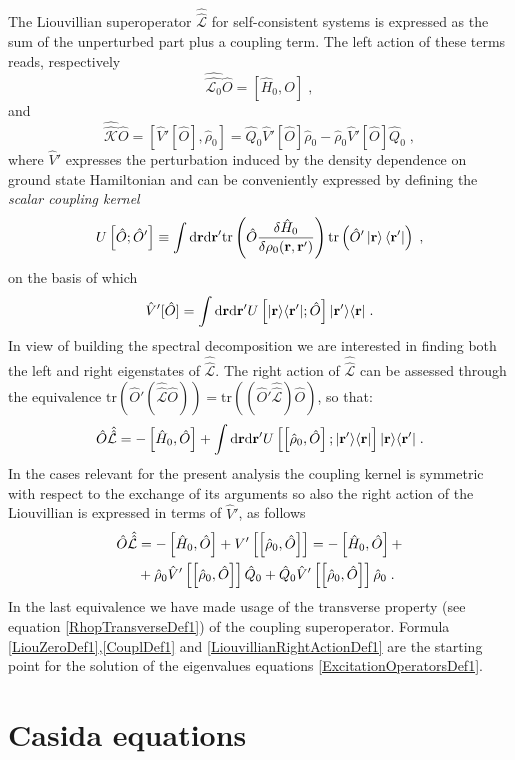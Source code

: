 \documentclass[reprint,aps,prb]{revtex4-1}
\newcommand{\dd}{{\rm d}}
\renewcommand{\r}{{\bf r}}
\newcommand{\be}{\begin{equation}}
\newcommand{\ee}{\end{equation}}
\newcommand{\nn}{\notag}
\newcommand{\lb}{\label}
\newcommand{\op}[1]{\hat {#1}}
\newcommand{\sop}[1]{\op{\op {#1}}}
\newcommand{\commutator}[2]{\left[ {#1} , {#2} \right]}
\newcommand{\trace}[1]{\mathrm{tr}\left(#1\right)}
\newcommand{\ketbra}[2]{| #1 \rangle \langle #2 |}
\newcommand{\dmnot}{\op{\rho}_0}
\newcommand{\hnot}{\op{H}_0}
\newcommand{\Liouv}{\sop{\mathcal L}}
\newcommand{\Liouvnot}{\sop{\mathcal L_0}}
\newcommand{\coupl}{\sop{\mathcal K}}
\begin{document}
The Liouvillian superoperator $\Liouv$ for self-consistent systems is expressed as the sum of the unperturbed part plus a coupling term. The left action of these 
terms reads, respectively
\be\lb{LiouZeroDef1}
\Liouvnot \op O = \commutator{\hnot}{O} \;,
\ee
and
\be\lb{CouplDef1}
\coupl\op O = \commutator{\op V'[\op O]}{\dmnot}  = \op Q_0\op V'[\op O]\dmnot - \dmnot\op V'[\op O]\op Q_0 \;,
\ee
where $\op V'$ expresses the perturbation induced by the density dependence on ground state Hamiltonian and can be conveniently expressed by defining the 
\emph{scalar coupling kernel}
\be\lb{CouplingKernelDef1}
U\left[\op O; \op O'\right] \equiv  \int \dd \r \dd \r' \trace{\op O \frac{\delta \hnot }{\delta \rho_0(\r,\r')}
} \trace{\op O' \ket{\r} \bra{\r'}} \;, \nn
\ee
on the basis of which
\be\lb{VpDef1}
\op V'[\op O]= 
\int \dd \r \dd \r' U\left[\ketbra{\r}{\r'};\op O\right] \ketbra{\r'}{\r}\;.
\ee
In view of building the spectral decomposition we are interested in finding both the left and right eigenstates of $\Liouv$.   
The right action of $\Liouv$ can be assessed through the equivalence $\trace{\op O'(\Liouv\op O)} = \trace{(\op O'\Liouv)\op O}$, so that:
\be
\op O\Liouv = -\commutator{\hnot}{\op O} + \int \dd\r\dd\r'
U\left[\commutator{\dmnot}{\op O};\ketbra{\r'}{\r}\right]\ketbra{\r}{\r'} \;. \nn
\ee
In the cases relevant for the present analysis the coupling kernel is symmetric with respect to the exchange of its arguments so also the right action of the 
Liouvillian is expressed in terms of $\op V'$, as follows
\begin{align}\lb{LiouvillianRightActionDef1}
\op O\Liouv &= -\commutator{\hnot}{\op O} + V'\left[\commutator{{\dmnot}}{\op O}\right] = -\commutator{\hnot}{\op O} + \nn \\ 
&+ \dmnot\op V'\left[\commutator{{\dmnot}}{\op O}\right]\op Q_0 + \op Q_0\op V'\left[\commutator{\dmnot}{\op O}\right]\dmnot \;.
\end{align}
In the last equivalence we have made usage of the transverse property (see equation \eqref{RhopTransverseDef1}) of the coupling superoperator. Formula 
\eqref{LiouZeroDef1},\eqref{CouplDef1} and \eqref{LiouvillianRightActionDef1} are the starting point for the solution of the eigenvalues equations \eqref{ExcitationOperatorsDef1}. 

\section{Casida equations}
\end{document}
